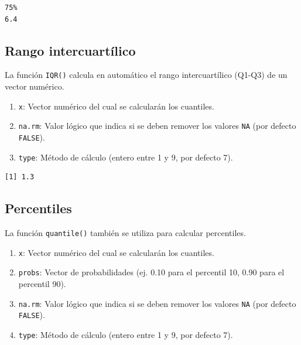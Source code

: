 \documentclass[
  spanish,
  letterpaper,
]{book}
\newenvironment{Shaded}{\begin{snugshade}}{\end{snugshade}}
\newcommand{\CommentTok}[1]{\textcolor[rgb]{0.37,0.37,0.37}{#1}}
\newcommand{\FloatTok}[1]{\textcolor[rgb]{0.68,0.00,0.00}{#1}}
\newcommand{\FunctionTok}[1]{\textcolor[rgb]{0.28,0.35,0.67}{#1}}
\newcommand{\NormalTok}[1]{\textcolor[rgb]{0.00,0.23,0.31}{#1}}
\newcommand{\OtherTok}[1]{\textcolor[rgb]{0.00,0.23,0.31}{#1}}
\newcommand{\SpecialCharTok}[1]{\textcolor[rgb]{0.37,0.37,0.37}{#1}}
\begin{document}
\begin{Shaded}
\end{Shaded}

\begin{verbatim}
75% 
6.4 
\end{verbatim}

\subsection{Rango intercuartílico}\label{rango-intercuartuxedlico}

La función \texttt{IQR()} calcula en automático el rango intercuartílico
(Q1-Q3) de un vector numérico.

\begin{enumerate}
\def\labelenumi{\arabic{enumi}.}
\item
  \texttt{x}: Vector numérico del cual se calcularán los cuantiles.
\item
  \texttt{na.rm}: Valor lógico que indica si se deben remover los
  valores \texttt{NA} (por defecto \texttt{FALSE}).
\item
  \texttt{type}: Método de cálculo (entero entre 1 y 9, por defecto 7).
\end{enumerate}

\begin{Shaded}
\end{Shaded}

\begin{verbatim}
[1] 1.3
\end{verbatim}

\subsection{Percentiles}\label{percentiles-1}

La función \texttt{quantile()} también se utiliza para calcular
percentiles.

\begin{enumerate}
\def\labelenumi{\arabic{enumi}.}
\item
  \texttt{x}: Vector numérico del cual se calcularán los cuantiles.
\item
  \texttt{probs}: Vector de probabilidades (ej. 0.10 para el percentil
  10, 0.90 para el percentil 90).
\item
  \texttt{na.rm}: Valor lógico que indica si se deben remover los
  valores \texttt{NA} (por defecto \texttt{FALSE}).
\item
  \texttt{type}: Método de cálculo (entero entre 1 y 9, por defecto 7).
\end{enumerate}
\end{document}

